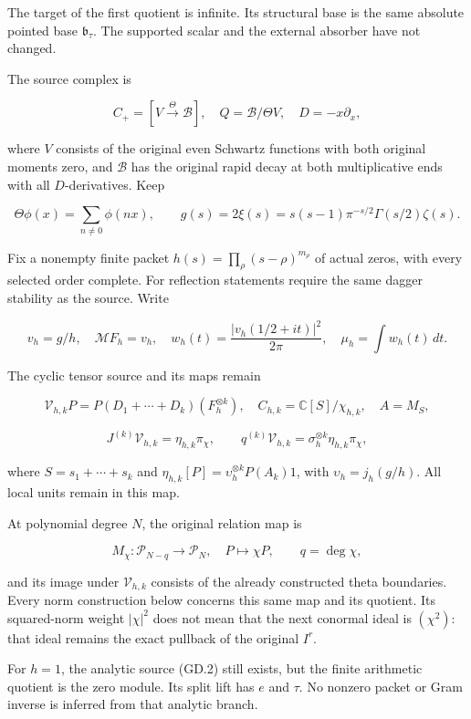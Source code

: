 The target of the first quotient is infinite. Its structural base is the
same absolute pointed base \(\mathfrak b_\tau\). The supported scalar
and the external absorber have not changed.

The source complex is

\[
C_+=[V\xrightarrow{\Theta}\mathscr B],\quad
Q=\mathscr B/\Theta V,\quad D=-x\partial_x,
\]

where \(V\) consists of the original even Schwartz functions with both
original moments zero, and \(\mathscr B\) has the original rapid decay
at both multiplicative ends with all \(D\)-derivatives. Keep

\[
\Theta\phi(x)=\sum_{n\ne0}\phi(nx),\qquad
 g(s)=2\xi(s)=s(s-1)\pi^{-s/2}\Gamma(s/2)\zeta(s).
\]

Fix a nonempty finite packet \(h(s)=\prod_\rho(s-\rho)^{m_\rho}\) of
actual zeros, with every selected order complete. For reflection
statements require the same dagger stability as the source. Write

\[
v_h=g/h,\quad \mathcal MF_h=v_h,\quad
w_h(t)=\frac{|v_h(1/2+it)|^2}{2\pi},\quad \mu_h=\int w_h(t)\,dt.       \tag{GD.2}
\]

The cyclic tensor source and its maps remain

\[
\mathcal V_{h,k}P=P(D_1+\cdots+D_k)(F_h^{\otimes k}),\quad
C_{h,k}=\mathbb C[S]/\chi_{h,k},\quad A=M_S,
\]

\[
J^{(k)}\mathcal V_{h,k}=\eta_{h,k}\pi_\chi,\qquad
q^{(k)}\mathcal V_{h,k}=\sigma_h^{\otimes k}\eta_{h,k}\pi_\chi,          \tag{GD.3}
\]

where \(S=s_1+\cdots+s_k\) and
\(\eta_{h,k}[P]=\upsilon_h^{\otimes k}P(A_k)1\), with
\(\upsilon_h=j_h(g/h)\). All local units remain in this map.

At polynomial degree \(N\), the original relation map is

\[
M_\chi:\mathcal P_{N-q}\longrightarrow\mathcal P_N,\quad P\mapsto\chi P,
\qquad q=\deg\chi,                                                   \tag{GD.4}
\]

and its image under \(\mathcal V_{h,k}\) consists of the already
constructed theta boundaries. Every norm construction below concerns
this same map and its quotient. Its squared-norm weight \(|\chi|^2\)
does not mean that the next conormal ideal is \((\chi^2)\): that ideal
remains the exact pullback of the original \(I^r\).

For \(h=1\), the analytic source (GD.2) still exists, but the finite
arithmetic quotient is the zero module. Its split lift has \(e\) and
\(\tau\). No nonzero packet or Gram inverse is inferred from that
analytic branch.

